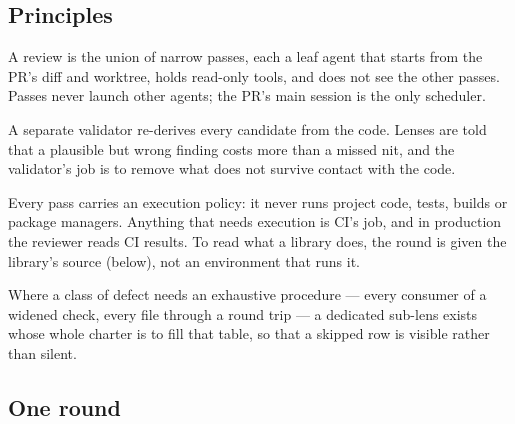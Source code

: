 \documentclass[11pt,a4paper]{article}
\begin{document}
\subsection{Principles}

\begin{description}[style=unboxed,leftmargin=0pt,itemsep=3pt]
\item[Independent angles.] A review is the union of narrow passes, each a
leaf agent that starts from the PR's diff and worktree, holds read-only
tools, and does not see the other passes. Passes never launch other agents;
the PR's main session is the only scheduler.
\item[A check before posting.] A separate validator re-derives every
candidate from the code. Lenses are told that a plausible but wrong finding
costs more than a missed nit, and the validator's job is to remove what does
not survive contact with the code.
\item[Read, never run.] Every pass carries an execution policy: it never runs
project code, tests, builds or package managers. Anything that needs
execution is CI's job, and in production the reviewer reads CI results. To
read what a library does, the round is given the library's source (below),
not an environment that runs it.
\item[Narrow procedures over broad instructions.] Where a class of defect
needs an exhaustive procedure --- every consumer of a widened check, every
file through a round trip --- a dedicated sub-lens exists whose whole charter
is to fill that table, so that a skipped row is visible rather than silent.
\end{description}

\subsection{One round}
\label{sec:round}
\end{document}
